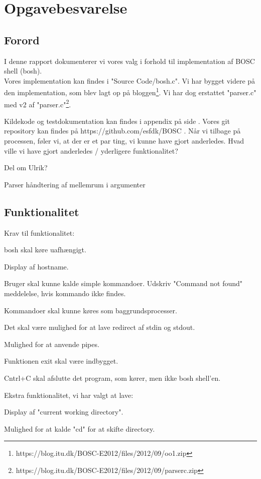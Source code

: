 \chapter{Opgavebesvarelse}
\section{Forord}
I denne rapport dokumenterer vi vores valg i forhold til implementation af BOSC shell (bosh). 
\\Vores implementation kan findes i "Source Code/bosh.c". Vi har bygget videre på den implementation, som blev lagt op på bloggen\footnote{https://blog.itu.dk/BOSC-E2012/files/2012/09/oo1.zip}. Vi har dog erstattet "parser.c" med v2 af  "parser.c"\footnote{ https://blog.itu.dk/BOSC-E2012/files/2012/09/parserc.zip}.

Kildekode og testdokumentation kan findes i appendix på side \pageref{Appendix}. Vores git repository kan findes på https://github.com/esfdk/BOSC .
Når vi tilbage på processen, føler vi, at der er et par ting, vi kunne have gjort anderledes.
Hvad ville vi have gjort anderledes / yderligere funktionalitet?

Del om Ulrik?

Parser håndtering af mellemrum i argumenter

\section{Funktionalitet}
Krav til funktionalitet:
\begin{my_enumerate}
\item bosh skal køre uafhængigt.
\item Display af hostname.
\item Bruger skal kunne kalde simple kommandoer. Udskriv "Command not found" meddelelse, hvis kommando ikke findes.
\item Kommandoer skal kunne køres som baggrundsprocesser.
\item Det skal være mulighed for at lave redirect af stdin og stdout.
\item Mulighed for at anvende pipes.
\item Funktionen exit skal være indbygget.
\item Cntrl+C skal afslutte det program, som kører, men ikke bosh shell'en.
\end{my_enumerate}

Ekstra funktionalitet, vi har valgt at lave:
\begin{my_enumerate}
\item Display af "current working directory".
\item Mulighed for at kalde "cd" for at skifte directory.
\end{my_enumerate}

